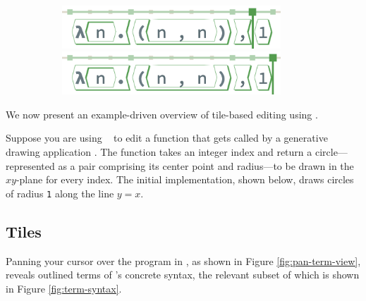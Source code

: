 \begin{figure}
\begin{subfigure}[c]{0.25\textwidth}
    \includegraphics[width=0.9\textwidth]{img/pan-tiles-9.png}
    \includegraphics[width=0.9\textwidth]{img/pan-tiles-10.png}
    \caption{}
    \label{fig:pan-tile-view}
  \end{subfigure}
\end{figure}

% 
% 


We now present an example-driven overview of tile-based
editing using \tylr.





Suppose you are using \tylr~ to edit a function that gets called by a
generative drawing application .
The function takes an integer index and
return a circle---represented as a pair comprising
its center point and radius---to be drawn in
the $xy$-plane for every index.
The initial implementation, shown below, draws circles
of radius \texttt{1} along the line $y = x$.

\subsection{Tiles}

Panning your cursor over the program in \tylr ,
as shown in Figure \ref{fig:pan-term-view},
reveals outlined terms of \tylr's concrete syntax,
the relevant subset of which is shown in
Figure \ref{fig:term-syntax}.

